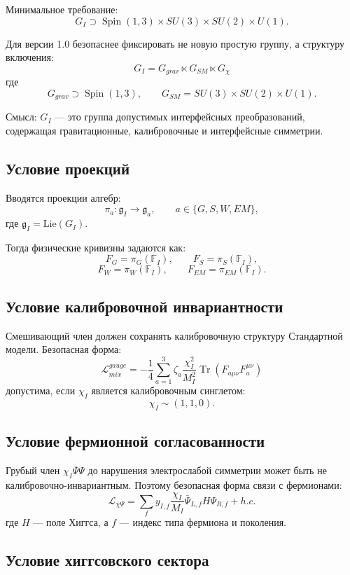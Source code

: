 \documentclass[12pt,a4paper]{article}
\DeclareMathOperator{\Spin}{Spin}
\DeclareMathOperator{\Tr}{Tr}
\begin{document}
Минимальное требование:
\[
\boxed{G_I\supset \Spin(1,3)\times SU(3)\times SU(2)\times U(1)}.
\]

Для версии 1.0 безопаснее фиксировать не новую простую группу, а структуру включения:
\[
\boxed{G_I=G_{grav}\ltimes G_{SM}\ltimes G_{\chi}}
\]
где
\[
G_{grav}\supset\Spin(1,3),\qquad G_{SM}=SU(3)\times SU(2)\times U(1).
\]

Смысл: $G_I$ — это группа допустимых интерфейсных преобразований, содержащая гравитационные, калибровочные и интерфейсные симметрии.

\subsection{Условие проекций}

Вводятся проекции алгебр:
\[
\boxed{\pi_a:\mathfrak g_I\to\mathfrak g_a,\qquad a\in\{G,S,W,EM\}},
\]
где $\mathfrak g_I=\mathrm{Lie}(G_I)$.

Тогда физические кривизны задаются как:
\[
\boxed{F_G=\pi_G(\mathbb F_I)},\qquad
\boxed{F_S=\pi_S(\mathbb F_I)},
\]
\[
\boxed{F_W=\pi_W(\mathbb F_I)},\qquad
\boxed{F_{EM}=\pi_{EM}(\mathbb F_I)}.
\]

\subsection{Условие калибровочной инвариантности}

Смешивающий член должен сохранять калибровочную структуру Стандартной модели. Безопасная форма:
\[
\boxed{
\mathcal L_{mix}^{gauge}
=-\frac14\sum_{a=1}^{3}\zeta_a\frac{\chi_I^2}{M_I^2}\Tr(F_{a\mu\nu}F_a^{\mu\nu})
}
\]
допустима, если $\chi_I$ является калибровочным синглетом:
\[
\boxed{\chi_I\sim(1,1,0)}.
\]

\subsection{Условие фермионной согласованности}

Грубый член $\chi_I\bar\Psi\Psi$ до нарушения электрослабой симметрии может быть не калибровочно-инвариантным. Поэтому безопасная форма связи с фермионами:
\[
\boxed{
\mathcal L_{\chi\Psi}
=
\sum_f y_{I,f}\frac{\chi_I}{M_I}\bar\Psi_{L,f}H\Psi_{R,f}+h.c.
}
\]
где $H$ — поле Хиггса, а $f$ — индекс типа фермиона и поколения.

\subsection{Условие хиггсовского сектора}
\end{document}
